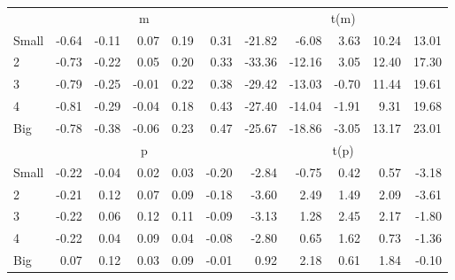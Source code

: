 \begin{table}[!ht]
\begin{tabular}{lrrrrrrrrrr}
  
    
      & \multicolumn{5}{c}{m} & \multicolumn{5}{c}{t(m)}
    
    \\
      \cmidrule(r){2-6} \cmidrule(r){7-11}

    Small   & -0.64  & -0.11  & 0.07  & 0.19  & 0.31  & -21.82  & -6.08  & 3.63  & 10.24  & 13.01  \\
         2  & -0.73  & -0.22  & 0.05  & 0.20  & 0.33  & -33.36  & -12.16  & 3.05  & 12.40  & 17.30  \\
         3  & -0.79  & -0.25  & -0.01  & 0.22  & 0.38  & -29.42  & -13.03  & -0.70  & 11.44  & 19.61  \\
         4  & -0.81  & -0.29  & -0.04  & 0.18  & 0.43  & -27.40  & -14.04  & -1.91  & 9.31  & 19.68  \\
    Big     & -0.78  & -0.38  & -0.06  & 0.23  & 0.47  & -25.67  & -18.86  & -3.05  & 13.17  & 23.01  \\

  
    
      & \multicolumn{5}{c}{p} & \multicolumn{5}{c}{t(p)}
    
    \\
      \cmidrule(r){2-6} \cmidrule(r){7-11}

    Small   & -0.22  & -0.04  & 0.02  & 0.03  & -0.20  & -2.84  & -0.75  & 0.42  & 0.57  & -3.18  \\
         2  & -0.21  & 0.12  & 0.07  & 0.09  & -0.18  & -3.60  & 2.49  & 1.49  & 2.09  & -3.61  \\
         3  & -0.22  & 0.06  & 0.12  & 0.11  & -0.09  & -3.13  & 1.28  & 2.45  & 2.17  & -1.80  \\
         4  & -0.22  & 0.04  & 0.09  & 0.04  & -0.08  & -2.80  & 0.65  & 1.62  & 0.73  & -1.36  \\
    Big     & 0.07  & 0.12  & 0.03  & 0.09  & -0.01  & 0.92  & 2.18  & 0.61  & 1.84  & -0.10  \\

  

  \bottomrule
\end{tabular}
\label{tbl:25_Size_Prior_B16}
\end{table}